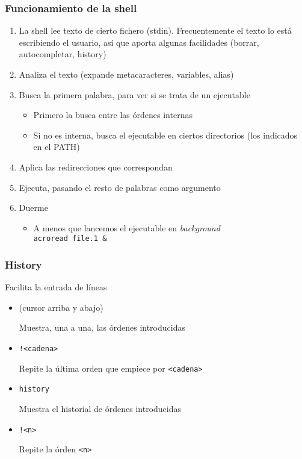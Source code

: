 \documentclass[ucs]{beamer}
\begin{document}


\begin{frame}[fragile]
\frametitle{Funcionamiento de la shell}
\begin{enumerate}
\item 
La shell lee texto de cierto fichero (stdin). Frecuentemente el texto lo
está escribiendo el usuario, así que aporta algunas facilidades (borrar, autocompletar, history)
\item 
Analiza el texto (expande metacaracteres, variables, alias) 
\item 
Busca la primera palabra, para ver si se trata de un ejecutable

\begin{itemize}
\item 
Primero la busca entre las órdenes internas
\item
Si no es interna, busca el ejecutable en 
ciertos directorios (los indicados en el PATH) 
\end{itemize}

\item
Aplica las redirecciones que correspondan
\item
Ejecuta, pasando el resto de palabras como argumento
\item 
Duerme
\begin{itemize}
\item 
A menos que lancemos el ejecutable en \emph{background}\\
\texttt{acroread file.1 \&}
\end{itemize}
\end{enumerate}
\end{frame}


\begin{frame}[fragile]
\frametitle{History}
Facilita la entrada de líneas

\begin{itemize}
\item
(cursor arriba y abajo)

Muestra, una a una, las órdenes introducidas
\item
\verb|!<cadena>|

Repite la última orden que empiece por \verb|<cadena>|
\item
\verb|history|

Muestra el historial de órdenes introducidas
\item
\verb|!<n>|

Repite la órden \verb|<n>|



\end{itemize}

\end{frame}
\end{document}
